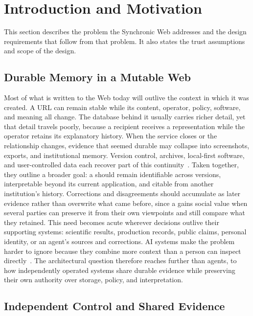 \section{Introduction and Motivation}
\label{sec:introduction}

This section describes the problem the Synchronic Web addresses and the design requirements that follow from that problem. It also states the trust assumptions and scope of the design.

\subsection{Durable Memory in a Mutable Web}

Most of what is written to the Web today will outlive the context in which it was created. A URL can remain stable while its content, operator, policy, software, and meaning all change. The database behind it usually carries richer detail, yet that detail travels poorly, because a recipient receives a representation while the operator retains its explanatory history. When the service closes or the relationship changes, evidence that seemed durable may collapse into screenshots, exports, and institutional memory. Version control, archives, local-first software, and user-controlled data each recover part of this continuity~\cite{Kleppmann2019local,Mansour2016solid}. Taken together, they outline a broader goal: a  should remain identifiable across versions, interpretable beyond its current application, and citable from another institution's history. Corrections and disagreements should accumulate as later evidence rather than overwrite what came before, since a  gains social value when several parties can preserve it from their own viewpoints and still compare what they retained. This need becomes acute wherever decisions outlive their supporting systems: scientific results, production records, public claims, personal identity, or an agent's sources and corrections. AI systems make the problem harder to ignore because they combine more context than a person can inspect directly~\cite{Lewis2020retrieval,Park2023generative,Anokhin2025arigraph,Gu2024hipporag}. The architectural question therefore reaches further than agents, to how independently operated systems share durable evidence while preserving their own authority over storage, policy, and interpretation.

\subsection{Independent Control and Shared Evidence}
\label{sec:control-evidence}


